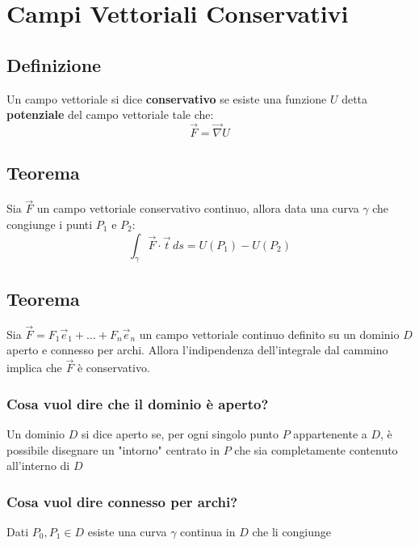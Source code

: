 \chapter{Campi Vettoriali Conservativi}

\section{Definizione}
Un campo vettoriale si dice \textbf{conservativo} se esiste una funzione $U$ detta \textbf{potenziale} del campo vettoriale tale che:
$$\vec{F} = \vec{\nabla}U$$

\section{Teorema}
Sia $\vec{F}$ un campo vettoriale conservativo continuo, allora data una curva $\gamma$ che congiunge i punti $P_1$ e $P_2$:
$$\int_{\gamma} \vec{F} \cdot \vec{t} \, ds = U(P_1) - U(P_2)$$

\section{Teorema}
Sia $\vec{F} = F_1 \vec{e}_1 + \dots + F_n \vec{e}_n$ un campo vettoriale continuo definito su un dominio $D$ aperto e connesso per archi.
Allora l'indipendenza dell'integrale dal cammino implica che $\vec{F}$ è conservativo.

\subsection{Cosa vuol dire che il dominio è aperto?}
Un dominio $D$ si dice aperto se, per ogni singolo punto $P$ appartenente a $D$, è possibile disegnare un "intorno" centrato in $P$ che sia completamente contenuto all'interno di $D$

\subsection{Cosa vuol dire connesso per archi?}
Dati $P_0, P_1 \in D$ esiste una curva $\gamma$ continua in $D$ che li congiunge

